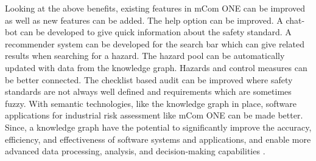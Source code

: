 Looking at the above benefits, existing features in mCom ONE can be improved as well as new features can be added. The help option can be improved. A chat-bot can be developed to give quick information about the safety standard. A recommender system can be developed for the search bar which can give related results when searching for a hazard. The hazard pool can be automatically updated with data from the knowledge graph. Hazards and control measures can be better connected. The checklist based audit can be improved where safety standards are not always well defined and requirements which are sometimes fuzzy. With semantic technologies, like the knowledge graph in place, software applications for industrial risk assessment like mCom ONE can be made better. Since, a knowledge graph have the potential to significantly improve the accuracy, efficiency, and effectiveness of software systems and applications, and enable more advanced data processing, analysis, and decision-making capabilities \cite{text2kg}.

